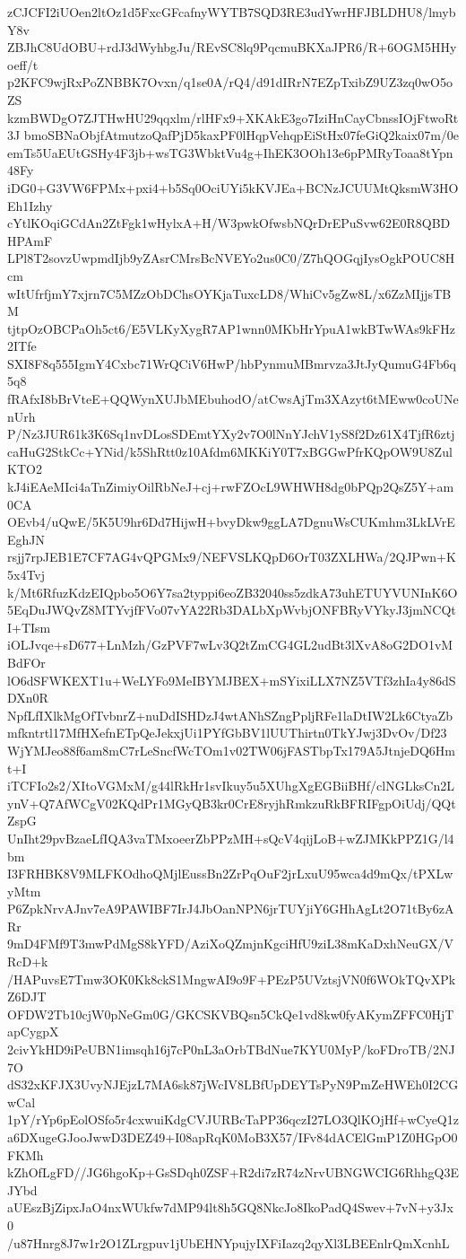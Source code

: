 zCJCFI2iUOen2ltOz1d5FxcGFcafnyWYTB7SQD3RE3udYwrHFJBLDHU8/lmybY8v
ZBJhC8UdOBU+rdJ3dWyhbgJu/REvSC8lq9PqcmuBKXaJPR6/R+6OGM5HHyoeff/t
p2KFC9wjRxPoZNBBK7Ovxn/q1se0A/rQ4/d91dIRrN7EZpTxibZ9UZ3zq0wO5oZS
kzmBWDgO7ZJTHwHU29qqxlm/rlHFx9+XKAkE3go7IziHnCayCbnssIOjFtwoRt3J
bmoSBNaObjfAtmutzoQafPjD5kaxPF0lHqpVehqpEiStHx07feGiQ2kaix07m/0e
emTs5UaEUtGSHy4F3jb+wsTG3WbktVu4g+IhEK3OOh13e6pPMRyToaa8tYpn48Fy
iDG0+G3VW6FPMx+pxi4+b5Sq0OciUYi5kKVJEa+BCNzJCUUMtQksmW3HOEh1Izhy
cYtlKOqiGCdAn2ZtFgk1wHylxA+H/W3pwkOfwsbNQrDrEPuSvw62E0R8QBDHPAmF
LPl8T2sovzUwpmdIjb9yZAsrCMrsBcNVEYo2us0C0/Z7hQOGqjIysOgkPOUC8Hcm
wItUfrfjmY7xjrn7C5MZzObDChsOYKjaTuxcLD8/WhiCv5gZw8L/x6ZzMIjjsTBM
tjtpOzOBCPaOh5ct6/E5VLKyXygR7AP1wnn0MKbHrYpuA1wkBTwWAs9kFHz2ITfe
SXI8F8q555IgmY4Cxbc71WrQCiV6HwP/hbPynmuMBmrvza3JtJyQumuG4Fb6q5q8
fRAfxI8bBrVteE+QQWynXUJbMEbuhodO/atCwsAjTm3XAzyt6tMEww0coUNenUrh
P/Nz3JUR61k3K6Sq1nvDLosSDEmtYXy2v7O0lNnYJchV1yS8f2Dz61X4TjfR6ztj
caHuG2StkCc+YNid/k5ShRtt0z10Afdm6MKKiY0T7xBGGwPfrKQpOW9U8ZulKTO2
kJ4iEAeMIci4aTnZimiyOilRbNeJ+cj+rwFZOcL9WHWH8dg0bPQp2QsZ5Y+am0CA
OEvb4/uQwE/5K5U9hr6Dd7HijwH+bvyDkw9ggLA7DgnuWsCUKmhm3LkLVrEEghJN
rsjj7rpJEB1E7CF7AG4vQPGMx9/NEFVSLKQpD6OrT03ZXLHWa/2QJPwn+K5x4Tvj
k/Mt6RfuzKdzEIQpbo5O6Y7sa2typpi6eoZB32040ss5zdkA73uhETUYVUNInK6O
5EqDuJWQvZ8MTYvjfFVo07vYA22Rb3DALbXpWvbjONFBRyVYkyJ3jmNCQtI+TIsm
iOLJvqe+sD677+LnMzh/GzPVF7wLv3Q2tZmCG4GL2udBt3lXvA8oG2DO1vMBdFOr
lO6dSFWKEXT1u+WeLYFo9MeIBYMJBEX+mSYixiLLX7NZ5VTf3zhIa4y86dSDXn0R
NpfLfIXlkMgOfTvbnrZ+nuDdISHDzJ4wtANhSZngPpljRFe1laDtIW2Lk6CtyaZb
mfkntrtl17MfHXefnETpQeJekxjUi1PYfGbBV1lUUThirtn0TkYJwj3DvOv/Df23
WjYMJeo88f6am8mC7rLeSncfWcTOm1v02TW06jFASTbpTx179A5JtnjeDQ6Hmt+I
iTCFIo2s2/XItoVGMxM/g44lRkHr1svIkuy5u5XUhgXgEGBiiBHf/clNGLksCn2L
ynV+Q7AfWCgV02KQdPr1MGyQB3kr0CrE8ryjhRmkzuRkBFRIFgpOiUdj/QQtZspG
UnIht29pvBzaeLfIQA3vaTMxoeerZbPPzMH+sQcV4qijLoB+wZJMKkPPZ1G/l4bm
I3FRHBK8V9MLFKOdhoQMjlEussBn2ZrPqOuF2jrLxuU95wca4d9mQx/tPXLwyMtm
P6ZpkNrvAJnv7eA9PAWIBF7IrJ4JbOanNPN6jrTUYjiY6GHhAgLt2O71tBy6zARr
9mD4FMf9T3mwPdMgS8kYFD/AziXoQZmjnKgciHfU9ziL38mKaDxhNeuGX/VRcD+k
/HAPuvsE7Tmw3OK0Kk8ckS1MngwAI9o9F+PEzP5UVztsjVN0f6WOkTQvXPkZ6DJT
OFDW2Tb10cjW0pNeGm0G/GKCSKVBQsn5CkQe1vd8kw0fyAKymZFFC0HjTapCygpX
2civYkHD9iPeUBN1imsqh16j7cP0nL3aOrbTBdNue7KYU0MyP/koFDroTB/2NJ7O
dS32xKFJX3UvyNJEjzL7MA6sk87jWcIV8LBfUpDEYTsPyN9PmZeHWEh0I2CGwCal
1pY/rYp6pEolOSfo5r4cxwuiKdgCVJURBcTaPP36qczI27LO3QlKOjHf+wCyeQ1z
a6DXugeGJooJwwD3DEZ49+I08apRqK0MoB3X57/IFv84dACElGmP1Z0HGpO0FKMh
kZhOfLgFD//JG6hgoKp+GsSDqh0ZSF+R2di7zR74zNrvUBNGWCIG6RhhgQ3EJYbd
aUEszBjZipxJaO4nxWUkfw7dMP94lt8h5GQ8NkcJo8IkoPadQ4Swev+7vN+y3Jx0
/u87Hnrg8J7w1r2O1ZLrgpuv1jUbEHNYpujyIXFiIazq2qyXl3LBEEnlrQmXcnhL
